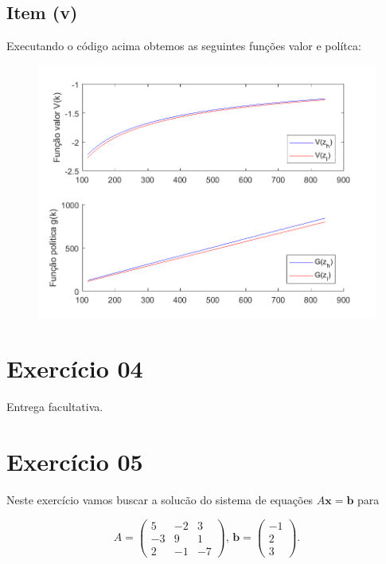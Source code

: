 \documentclass{article}
\begin{document}
\newpage
\subsection*{Item (v)}

Executando o código acima obtemos as seguintes funções valor e polítca:

\begin{figure}[!ht]
  \includegraphics[scale=0.6]{ex3/ex3_1.png}
\end{figure}

\section*{Exercício 04}

Entrega facultativa.

\section*{Exercício 05}

Neste exercício vamos buscar a solucão do sistema de equações $A \mathbf{x} = \mathbf{b}$ para 

\[
A = \begin{pmatrix}
    5 & -2 & 3 \\
    -3 & 9 & 1 \\
    2 & -1 & - 7
\end{pmatrix}
, \,
\mathbf{b} = 
\begin{pmatrix}
	-1 \\
	 2 \\
	 3
\end{pmatrix}.
\] \\
\end{document}
